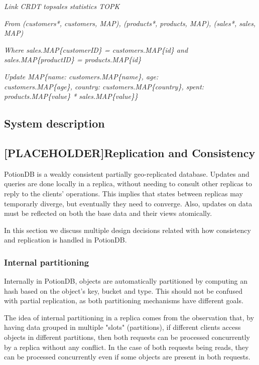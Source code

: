 \documentclass{vldb}
\newcommand{\emphvspace}{0.5\baselineskip}
\newcommand{\firstblockemph}[1]{\vspace{\emphvspace}\hspace{2em}\emph{#1}}
\newcommand{\middleblockemph}[1]{\hspace{2em}\emph{#1}}
\newcommand{\lastblockemph}[1]{\hspace{2em}\emph{#1}\vspace{\emphvspace}}
\begin{document}
\firstblockemph{Link CRDT topsales statistics TOPK}

\middleblockemph{From (customers*, customers, MAP), (products*, products, MAP), (sales*, sales, MAP)}

\middleblockemph{Where sales.MAP\{customerID\} = customers.MAP\{id\} \emph{and}  sales.MAP\{productID\} = products.MAP\{id\}}

\lastblockemph{Update MAP\{name: customers.MAP\{name\}, age: \\ customers.MAP\{age\}, country: customers.MAP\{country\}, spent: products.MAP\{value\} * sales.MAP\{value\}\}}

\subsection{System description}


\subsection{[PLACEHOLDER]Replication and Consistency}

PotionDB is a weakly consistent partially geo-replicated database.
Updates and queries are done locally in a replica, without needing to consult other replicas to reply to the clients' operations.
This implies that states between replicas may temporarly diverge, but eventually they need to converge.
Also, updates on data must be reflected on both the base data and their views atomically.

In this section we discuss multiple design decisions related with how consistency and replication is handled in PotionDB.

\subsubsection{Internal partitioning}

Internally in PotionDB, objects are automatically partitioned by computing an hash based on the object's key, bucket and type.
This should not be confused with partial replication, as both partitioning mechanisms have different goals.

The idea of internal partitioning in a replica comes from the observation that, by having data grouped in multiple "slots" (partitions), if different clients access objects in different partitions, then both requests can be processed concurrently by a replica without any conflict.
In the case of both requests being reads, they can be processed concurrently even if some objects are present in both requests. %
\end{document}
